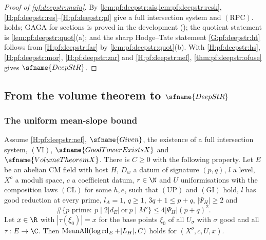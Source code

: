 \begin{proof}[Proof of \cref{pf:deepstr:main}]
By \cref{lem:pf:deepstr:ais,lem:pf:deepstr:resk}, \ref{H:pf:deepstr:res}--\ref{H:pf:deepstr:pl} give a full
intersection system and $\mathrm{(RPC)}$.  holds; GAGA for sections is proved in
the development (); the quotient statement is
\cref{lem:pf:deepstr:quot}(a); and the sharp Hodge--Tate statement \ref{G:pf:deepstr:ht} follows from \ref{H:pf:deepstr:far} by
\cref{lem:pf:deepstr:quot}(b). With \ref{H:pf:deepstr:hs}, \ref{H:pf:deepstr:mor}, \ref{H:pf:deepstr:zar}
and \ref{H:pf:deepstr:nef}, \cref{thm:pf:deepstr:ofuse} gives $\sfname{DeepStR}$.
\end{proof}

\subsection{From the volume theorem to \texorpdfstring{$\sfname{DeepStR}$}{DeepStR}}\label{sec:pf:deepstr:volume}

\subsubsection*{The uniform mean-slope bound}

\begin{theorem}\label{thm:pf:deepstr:meanall}
Assume \ref{H:pf:deepstr:nef}, $\sfname{Given}$, the existence of a full intersection system, $\mathrm{(VI)}$,
$\sfname{GoodTowerExistsX}$ and $\sfname{VolumeTheoremX}$. There is $C\ge0$ with the following property. Let
$E$ be an abelian CM field with host $H$, $D_w$ a datum of signature $(p,q)$, $l$ a level, $X^o$ a moduli
space, $c$ a coefficient datum, $r\in\N$ and $U$ uniformisations with the composition laws $\mathrm{(CL)}$ for some
$h,e$, such that $\mathrm{(UP)}$ and $\mathrm{(GI)}$ hold, $l$ has good reduction at every prime,
$l_A=1$, $q\ge1$, $3q+1\le p+q$, $|\Psi_H|\ge2$ and
\begin{equation}\label{eq:pf:deepstr:badhyp}
\#\{p\text{ prime}:\ p\mid2|d_E|\ \text{or}\ p\mid M'\}\le4|\Psi_H|(p+q)^2.
\end{equation}
Let $x\in\R$ with $|\tau(\xi_0)|=x$ for the base points $\xi_0$ of all $U_\sigma$ with $\sigma$ good and all
$\tau\colon E\to\C$. Then $\operatorname{MeanAll}(\log\operatorname{rd}_E+|L_H|,C)$ holds for $(X^o,c,U,x)$.
\end{theorem}


